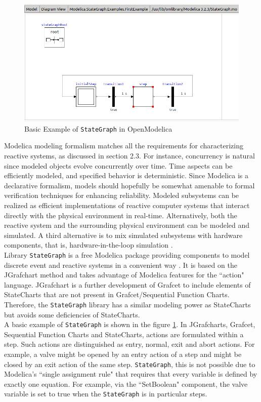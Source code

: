 \documentclass[12pt]{report}
\begin{document}
\begin{figure}[h]
\centering
\includegraphics[width=\textwidth]{images/stategraph.png}
\caption{Basic Example of \texttt{StateGraph} in OpenModelica}
\label{fig:stategraph}
\end{figure}

Modelica modeling formalism matches all the requirements for characterizing reactive systems, as discussed in section 2.3. For instance, concurrency is natural since modeled objects evolve concurrently over time. Time aspects can be efficiently modeled, and specified behavior is deterministic. Since Modelica is a declarative formalism, models should hopefully be somewhat amenable to formal verification techniques for enhancing reliability. Modeled subsystems can be realized as efficient implementations of reactive computer systems that interact directly with the physical environment in real-time. Alternatively, both the reactive system and the surrounding physical environment can be modeled and simulated. A third alternative is to mix simulated subsystems with hardware components, that is, hardware-in-the-loop simulation \cite{hil}.\\ 

Library \texttt{StateGraph} is a free Modelica package providing components to model discrete event and reactive systems in a convenient way \cite{stategraph}. It is based on the JGrafchart method and takes advantage of Modelica features for the ``action" language. JGrafchart is a further development of Grafcet to include elements of StateCharts that are not present in Grafcet/Sequential Function Charts. Therefore, the \texttt{StateGraph} library has a similar modeling power as StateCharts but avoids some deficiencies of StateCharts. \\

A basic example of \texttt{StateGraph} is shown in the figure \ref{fig:stategraph}. In JGrafcharts, Grafcet, Sequential Function Charts and StateCharts, actions are formulated within a step. Such actions are distinguished as entry, normal, exit and abort actions. For example, a valve might be opened by an entry action of a step and might be closed by an exit action of the same step.  \texttt{StateGraph}, this is not possible due to Modelica's ``single assignment rule" that requires that every variable is defined by exactly one equation. For example, via the ``SetBoolean" component, the valve variable is set to true when the \texttt{StateGraph} is in particular steps. \\ 
\end{document}
